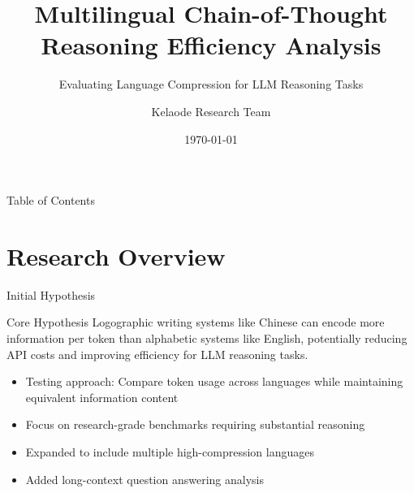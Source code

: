\documentclass{beamer}
\title{Multilingual Chain-of-Thought Reasoning Efficiency Analysis}
\subtitle{Evaluating Language Compression for LLM Reasoning Tasks}
\author{Kelaode Research Team}
\date{\today}
\begin{document}
\begin{frame}
    \titlepage
\end{frame}

\begin{frame}{Table of Contents}
    \tableofcontents
\end{frame}

\section{Research Overview}

\begin{frame}{Initial Hypothesis}
    \begin{block}{Core Hypothesis}
        Logographic writing systems like Chinese can encode more information per token than alphabetic systems like English, potentially reducing API costs and improving efficiency for LLM reasoning tasks.
    \end{block}
    
    \begin{itemize}
        \item Testing approach: Compare token usage across languages while maintaining equivalent information content
        \item Focus on research-grade benchmarks requiring substantial reasoning
        \item Expanded to include multiple high-compression languages
        \item Added long-context question answering analysis
    \end{itemize}
\end{frame}
\end{document}
